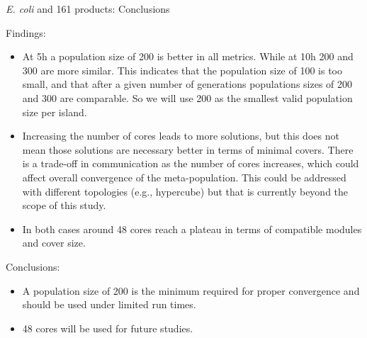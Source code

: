 \documentclass[8pt]{beamer}
\begin{document}
\begin{frame}{\protect\textit{E. coli} and 161 products: Conclusions}

    Findings:
\begin{itemize}
    \item At 5h a population size of 200 is better in all metrics. While at 10h 200 and 300 are more similar. This indicates that the population size of 100 is too small, and that after a given number of generations populations sizes of 200 and 300 are comparable. So we will use 200 as the smallest valid population size per island.
    \item Increasing the number of cores leads to more solutions, but this does not mean those solutions are necessary better in terms of minimal covers. There is a trade-off in communication as the number of cores increases, which could affect overall convergence of the meta-population. This could be addressed with different topologies (e.g., hypercube) but that is currently beyond the scope of this study.
    \item In both cases around 48 cores reach a plateau in terms of compatible modules and cover size.
\end{itemize}


    Conclusions:
\begin{itemize}
    \item A population size of 200 is the minimum required for proper convergence and should be used under limited run times.
    \item 48 cores will be used for future studies.
\end{itemize}
\end{frame}
\end{document}
